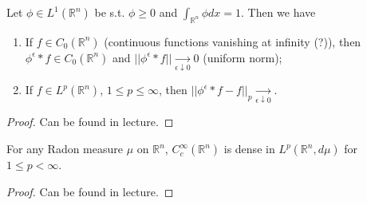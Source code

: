 \begin{proposition}
    Let \(\phi\in L^1(\mathbb{R}^n)\) be s.t. \(\phi\geq 0\) and \(\int_{\mathbb{R}^n}\phi dx=1\). Then we have
    \begin{enumerate}[label=(\roman*)]
        \item If \(f\in C_0(\mathbb{R}^n)\) (continuous functions vanishing at infinity (?)), then \(\phi^{\epsilon}\ast f\in C_0(\mathbb{R}^n)\) and \(||\phi^{\epsilon}\ast f||\xrightarrow[\epsilon\downarrow 0]{ } 0\) (uniform norm);
        \item If \(f\in L^p(\mathbb{R}^n)\), \(1\leq p\leq\infty\), then \(||\phi^{\epsilon}\ast f -f||_p\xrightarrow[\epsilon\downarrow 0]{ }\).
    \end{enumerate}
\end{proposition}
\ifdetailed 
\begin{proof}
    Can be found in lecture.
\end{proof}
\fi 
\begin{corollary}
    For any Radon measure \(\mu\) on \(\mathbb{R}^n\), \(C^{\infty}_{c}(\mathbb{R}^n)\) is dense in \(L^p(\mathbb{R}^n, d\mu)\) for \(1\leq p <\infty\).
\end{corollary}
\ifdetailed 
\begin{proof}
    Can be found in lecture.
\end{proof}
\fi 